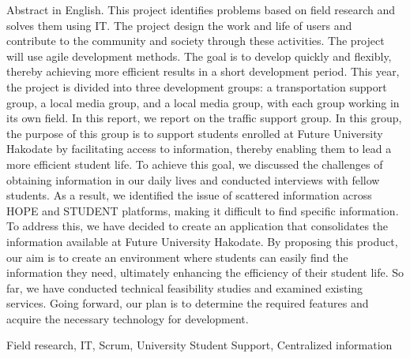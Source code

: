 \documentclass[openany,11pt,papersize,dvipdfm]{jsbook}
\begin{document}
\begin{eabstract} Abstract in English. 
This project identifies problems based on field research and solves them using IT. The
project design the work and life of users and contribute to the community and society through these activities. The project will use agile development methods. The goal is to develop quickly and flexibly, thereby achieving more efficient results in a short development period. This year, the project is divided into three development groups: a transportation support group, a local media group, and a local media group, with each group working in its own field. In this report, we report on the traffic support group. In this group, the purpose of this group is to support students enrolled at Future University Hakodate by facilitating access to information, thereby enabling them to lead a more efficient student life. To achieve this goal, we discussed the challenges of obtaining information in our daily lives and conducted interviews with fellow students. As a result, we identified the issue of scattered information across HOPE and STUDENT platforms, making it difficult to find specific information. To address this, we have decided to create an application that consolidates the information available at Future University Hakodate. By proposing this product, our aim is to create an environment where students can easily find the information they need, ultimately enhancing the efficiency of their student life. So far, we have conducted technical feasibility studies and examined existing services. Going forward, our plan is to determine the required features and acquire the necessary technology for development.







\begin{ekeyword}
Field research, IT, Scrum, University Student Support, Centralized information
\end{ekeyword}
\end{eabstract}

\tableofcontents%

\mainmatter%







\end{document}
